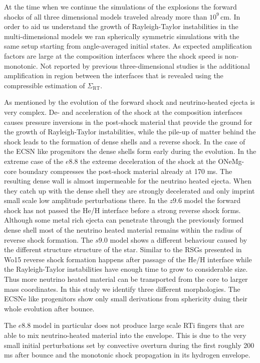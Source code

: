 \documentclass[fleqn,usenatbib]{mnras}
\begin{document}
At the time when we continue the simulations of the explosions the forward shocks of all three dimensional models traveled already more than $10^9\,\mathrm{cm}$. 
In order to aid us understand the growth of Rayleigh-Taylor instabilities in the multi-dimensional models we ran spherically symmetric simulations with the same setup starting from angle-averaged initial states. As expected amplification factors are large at the composition interfaces where the shock speed is non-monotonic. Not reported by previous three-dimensional studies is the additional amplification in region between the interfaces that is revealed using the compressible estimation of $\Sigma_{\mathrm{RT}}$.

As mentioned by \citet{Wongwathanarat2015} the evolution of the forward shock and neutrino-heated ejecta is very complex. De- and acceleration of the shock at the composition interfaces causes pressure inversions in the post-shock material that provide the ground for the growth of Rayleigh-Taylor instabilities, while the pile-up of matter behind the shock leads to the formation of dense shells and a reverse shock. 
In the case of the ECSN like progenitors the dense shells form early during the evolution. In the extreme case of the $e8.8$ the extreme deceleration of the shock at the ONeMg-core boundary compresses the post-shock material already at 170 ms. The resulting dense wall is almost impermeable for the neutrino heated ejecta. When they catch up with the dense shell they are strongly decelerated and only imprint small scale low amplitude perturbations there. 
In the $z9.6$ model the forward shock has not passed the He/H interface before a strong reverse shock forms. Although some metal rich ejecta can penetrate through the previously formed dense shell most of the neutrino heated material remains within the radius of reverse shock formation.
The $s9.0$ model shows a different behaviour caused by the different structure structure of the star. Similar to the RSGs presented in Wo15 reverse shock formation happens after passage of the He/H interface while the Rayleigh-Taylor instabilities have enough time to grow to considerable size. Thus more neutrino heated material can be transported from the core to larger mass coordinates. 
In this study we identify three different morphologies.
The ECSNe like progenitors show only small derivations from sphericity duing their whole evolution after bounce.

The $e8.8$ model in particular does not produce large scale RTi fingers that are able to mix neutrino-heated material into the envelope. This is due to the very small initial perturbations set by convective overturn during the first roughly 200 ms after bounce and the monotonic shock propagation in its hydrogen envelope. 
\end{document}
